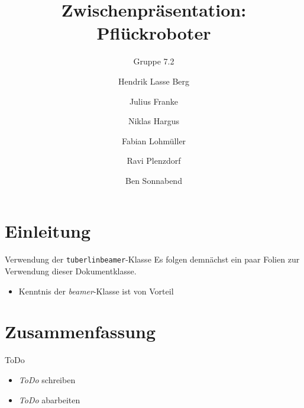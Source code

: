 \documentclass[Nike]{tuberlinbeamer}
\title{Zwischenpräsentation: Pflückroboter}
\subtitle{Gruppe 7.2}
\author{Hendrik Lasse Berg \and Julius Franke  \and Niklas Hargus \and Fabian Lohmüller \and Ravi Plenzdorf \and Ben Sonnabend}
\institute{Technische Universität Berlin}
\begin{document}
\begin{frame}
\maketitle
\end{frame}


\begin{frame}
\tableofcontents
\end{frame}

\section{Einleitung}

\begin{frame}[fragile]{Verwendung der \texttt{tuberlinbeamer}-Klasse}
Es folgen demnächst ein paar Folien zur Verwendung dieser Dokumentklasse.
\begin{itemize}
\item Kenntnis der \emph{beamer}-Klasse ist von Vorteil
\end{itemize}
\end{frame}

\section{Zusammenfassung}

\begin{frame}{ToDo}
\begin{itemize}
\item \emph{ToDo} schreiben
\item \emph{ToDo} abarbeiten
\end{itemize}
\end{frame}
\end{document}
